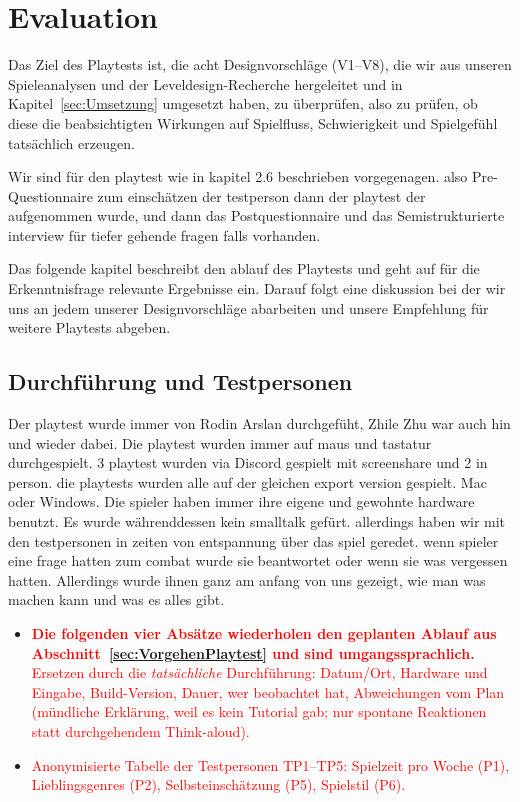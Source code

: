 \documentclass[../Main.tex]{subfiles}
\begin{document}
\section{Evaluation} \label{sec:Evaluation}

Das Ziel des Playtests ist, die acht Designvorschläge (V1--V8), die wir aus unseren Spieleanalysen und der Leveldesign-Recherche hergeleitet und in Kapitel~\ref{sec:Umsetzung} umgesetzt haben, zu überprüfen, also zu prüfen, ob diese die beabsichtigten Wirkungen auf Spielfluss, Schwierigkeit und Spielgefühl tatsächlich erzeugen.

Wir sind für den playtest wie in kapitel 2.6 beschrieben vorgegenagen. also Pre-Questionnaire zum einschätzen der testperson dann der playtest der aufgenommen wurde, und dann das Postquestionnaire und das Semistrukturierte interview für tiefer gehende fragen falls vorhanden.

Das folgende kapitel beschreibt den ablauf des Playtests und geht auf für die Erkenntnisfrage relevante Ergebnisse ein. Darauf folgt eine diskussion bei der wir uns an jedem unserer Designvorschläge abarbeiten und unsere Empfehlung für weitere Playtests abgeben.

\subsection{Durchführung und Testpersonen} \label{sec:Durchfuehrung}
Der playtest wurde immer von Rodin Arslan durchgefüht, Zhile Zhu war auch hin und wieder dabei. Die playtest wurden immer auf maus und tastatur durchgespielt. 3 playtest wurden via Discord gespielt mit screenshare und 2 in person. die playtests wurden alle auf der gleichen export version gespielt. Mac oder Windows. Die spieler haben immer ihre eigene und gewohnte hardware benutzt. Es wurde währenddessen kein smalltalk gefürt. allerdings haben wir mit den testpersonen in zeiten von entspannung über das spiel geredet. wenn spieler eine frage hatten zum combat wurde sie beantwortet oder wenn sie was vergessen hatten. Allerdings wurde ihnen ganz am anfang von uns gezeigt, wie man was machen kann und was es alles gibt.
\begin{itemize}[leftmargin=1.5cm]
    \item \textcolor{red}{\textbf{Die folgenden vier Absätze wiederholen den geplanten Ablauf aus Abschnitt~\ref{sec:VorgehenPlaytest} und sind umgangssprachlich.} Ersetzen durch die \emph{tatsächliche} Durchführung: Datum/Ort, Hardware und Eingabe, Build-Version, Dauer, wer beobachtet hat, Abweichungen vom Plan (mündliche Erklärung, weil es kein Tutorial gab; nur spontane Reaktionen statt durchgehendem Think-aloud).}
    \item \textcolor{red}{Anonymisierte Tabelle der Testpersonen TP1--TP5: Spielzeit pro Woche (P1), Lieblingsgenres (P2), Selbsteinschätzung (P5), Spielstil (P6).}
\end{itemize}
\end{document}
